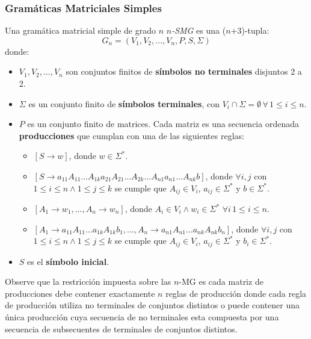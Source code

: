 \documentclass{article}
\begin{document}
\subsubsection{Gramáticas Matriciales Simples}

Una gramática matricial simple de grado $n$ \textit{$n$-SMG} es una ($n$+3)-tupla:
$$
      G_n=(V_1,V_2,\ldots,V_n,P,S,\Sigma)
$$
donde:
\begin{itemize}
      \item \( V_1, V_2, \ldots, V_n \) son conjuntos finitos de \textbf{símbolos no terminales} disjuntos 2 a 2.
      \item \( \Sigma \) es un conjunto finito de \textbf{símbolos terminales}, con \( V_i \cap \Sigma = \emptyset\,\forall\,1\leq i\leq n \).
      \item \( P \) es un conjunto finito de matrices. Cada matriz es una secuencia ordenada \textbf{producciones} que cumplan con una de las siguientes reglas:
            \begin{itemize}
                  \item $[S\to w]$, donde $w\in \Sigma ^*$.
                  \item $[S\to a_{11}A_{11}\ldots A_{1k}a_{21}A_{21}\ldots A_{2k}\ldots A_{n1}a_{n1}\ldots A_{nk}b]$,
                        donde $\forall i,j$ con $1\leq i\leq n\wedge 1\leq j\leq k$ se cumple que
                        $A_{ij}\in V_i$, $a_{ij}\in \Sigma ^*$ y $b\in \Sigma ^*$.
                  \item $[A_1\to w_1,\ldots, A_n\to w_n]$, donde $A_i\in V_i\wedge w_i\in \Sigma ^*$ $\forall i\, 1\leq i\leq n$.
                  \item $[A_1 \to a_{11}A_{11}\ldots a_{1k}A_{1k}b_1,\ldots,A_n \to a_{n1}A_{n1}\ldots a_{nk}A_{nk}b_n]$, donde $\forall i,j$
                        con $1\leq i\leq n\wedge 1\leq j\leq k$ se cumple que
                        $A_{ij}\in V_i$, $a_{ij}\in \Sigma ^*$ y $b_{i}\in \Sigma ^*$.
            \end{itemize}
      \item \( S \) es el \textbf{símbolo inicial}.
\end{itemize}


Observe que la restricción impuesta sobre las $n$-MG es cada matriz de producciones debe contener exactamente $n$ reglas de producción
donde cada regla de producción utiliza no terminales de conjuntos distintos o puede contener una única producción cuya secuencia de no terminales
esta compuesta por una secuencia de subsecuentes de terminales de conjuntos distintos.
\end{document}
